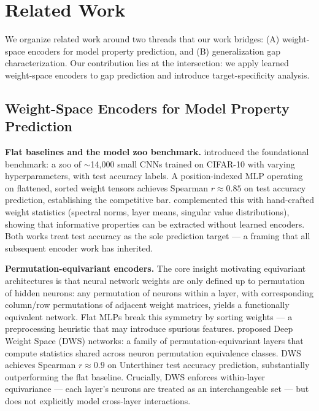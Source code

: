 \section{Related Work}
\label{sec:related}

We organize related work around two threads that our work bridges: (A) weight-space encoders for model
property prediction, and (B) generalization gap characterization. Our contribution lies at the intersection:
we apply learned weight-space encoders to gap prediction and introduce target-specificity analysis.

\subsection{Weight-Space Encoders for Model Property Prediction}

\textbf{Flat baselines and the model zoo benchmark.} \citet{unterthiner2020} introduced the foundational
benchmark: a zoo of $\sim$14,000 small CNNs trained on CIFAR-10 with varying hyperparameters, with test accuracy
labels. A position-indexed MLP operating on flattened, sorted weight tensors achieves Spearman $r \approx 0.85$ on
test accuracy prediction, establishing the competitive bar. \citet{eilertsen2020} complemented this with
hand-crafted weight statistics (spectral norms, layer means, singular value distributions), showing that
informative properties can be extracted without learned encoders. Both works treat test accuracy as the
sole prediction target --- a framing that all subsequent encoder work has inherited.

\textbf{Permutation-equivariant encoders.} The core insight motivating equivariant architectures is that neural
network weights are only defined up to permutation of hidden neurons: any permutation of neurons within a
layer, with corresponding column/row permutations of adjacent weight matrices, yields a functionally
equivalent network. Flat MLPs break this symmetry by sorting weights --- a preprocessing heuristic that may
introduce spurious features. \citet{navon2023} proposed Deep Weight Space (DWS) networks: a family of
permutation-equivariant layers that compute statistics shared across neuron permutation equivalence classes.
DWS achieves Spearman $r \approx 0.9$ on Unterthiner test accuracy prediction, substantially outperforming the flat
baseline. Crucially, DWS enforces within-layer equivariance --- each layer's neurons are treated as an
interchangeable set --- but does not explicitly model cross-layer interactions.

